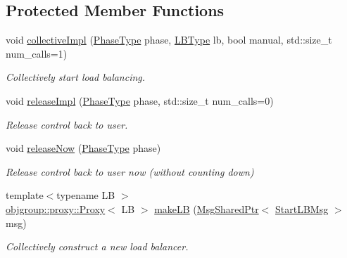 \subsection*{Protected Member Functions}
\begin{DoxyCompactItemize}
\item 
void \hyperlink{structvt_1_1vrt_1_1collection_1_1balance_1_1_l_b_manager_a591eef7303a18ce4ef2fd35cfecbf512}{collective\+Impl} (\hyperlink{namespacevt_a46ce6733d5cdbd735d561b7b4029f6d7}{Phase\+Type} phase, \hyperlink{namespacevt_1_1vrt_1_1collection_1_1balance_ac4f99693509affcc67db182d4aad9b5c}{L\+B\+Type} lb, bool manual, std\+::size\+\_\+t num\+\_\+calls=1)
\begin{DoxyCompactList}\small\item\em Collectively start load balancing. \end{DoxyCompactList}\item 
void \hyperlink{structvt_1_1vrt_1_1collection_1_1balance_1_1_l_b_manager_a7e05ed9957f272ac5cc8b999f66fa403}{release\+Impl} (\hyperlink{namespacevt_a46ce6733d5cdbd735d561b7b4029f6d7}{Phase\+Type} phase, std\+::size\+\_\+t num\+\_\+calls=0)
\begin{DoxyCompactList}\small\item\em Release control back to user. \end{DoxyCompactList}\item 
void \hyperlink{structvt_1_1vrt_1_1collection_1_1balance_1_1_l_b_manager_a6ed483eb58a583c48f430276c2f25c14}{release\+Now} (\hyperlink{namespacevt_a46ce6733d5cdbd735d561b7b4029f6d7}{Phase\+Type} phase)
\begin{DoxyCompactList}\small\item\em Release control back to user now (without counting down) \end{DoxyCompactList}\item 
{\footnotesize template$<$typename LB $>$ }\\\hyperlink{structvt_1_1objgroup_1_1proxy_1_1_proxy}{objgroup\+::proxy\+::\+Proxy}$<$ LB $>$ \hyperlink{structvt_1_1vrt_1_1collection_1_1balance_1_1_l_b_manager_abccd80f12ce1ced9e22f32f886a9acf6}{make\+LB} (\hyperlink{namespacevt_ab2b3d506ec8e8d1540aede826d84a239}{Msg\+Shared\+Ptr}$<$ \hyperlink{structvt_1_1vrt_1_1collection_1_1balance_1_1_start_l_b_msg}{Start\+L\+B\+Msg} $>$ msg)
\begin{DoxyCompactList}\small\item\em Collectively construct a new load balancer. \end{DoxyCompactList}\end{DoxyCompactItemize}
